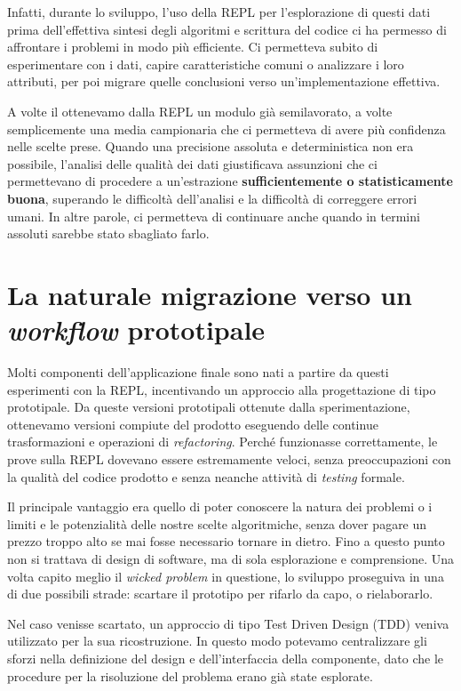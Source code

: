 \documentclass[12pt]{report}
\begin{document}
Infatti, durante lo sviluppo, l'uso della REPL per l'esplorazione di questi dati prima dell'effettiva sintesi degli algoritmi e scrittura del codice ci ha permesso di affrontare i problemi in modo più efficiente. Ci permetteva subito di esperimentare con i dati, capire caratteristiche comuni o analizzare i loro attributi, per poi migrare quelle conclusioni verso un'implementazione effettiva. 

A volte il ottenevamo dalla REPL un modulo già semilavorato, a volte semplicemente una media campionaria che ci permetteva di avere più confidenza nelle scelte prese.
Quando una precisione assoluta e deterministica non era possibile, l'analisi delle qualità dei dati giustificava assunzioni che ci permettevano di procedere a un'estrazione \textbf{sufficientemente o statisticamente buona}, superando le difficoltà dell'analisi e la difficoltà di correggere errori umani. In altre parole, ci permetteva di continuare anche quando in termini assoluti sarebbe stato sbagliato farlo.

\section{La naturale migrazione verso un \textit{workflow} prototipale}

Molti componenti dell'applicazione finale sono nati a partire da questi esperimenti con la REPL, incentivando un approccio alla progettazione di tipo prototipale. Da queste versioni prototipali ottenute dalla sperimentazione, ottenevamo versioni compiute del prodotto eseguendo delle continue trasformazioni e operazioni di \textit{refactoring}. Perché funzionasse correttamente, le prove sulla REPL dovevano essere estremamente veloci, senza preoccupazioni con la qualità del codice prodotto e senza neanche attività di \textit{testing} formale. 

Il principale vantaggio era quello di poter conoscere la natura dei problemi o i limiti e le potenzialità delle nostre scelte algoritmiche, senza dover pagare un prezzo troppo alto se mai fosse necessario tornare in dietro. Fino a questo punto non si trattava di design di software, ma di sola esplorazione e comprensione. Una volta capito meglio il \textit{wicked problem} in questione, lo sviluppo proseguiva in una di due possibili strade: scartare il prototipo per rifarlo da capo, o rielaborarlo.

Nel caso venisse scartato, un approccio di tipo Test Driven Design (TDD) veniva utilizzato per la sua ricostruzione. In questo modo potevamo centralizzare gli sforzi nella definizione del design e dell'interfaccia della componente, dato che le procedure per la risoluzione del problema erano già state esplorate.
\end{document}
